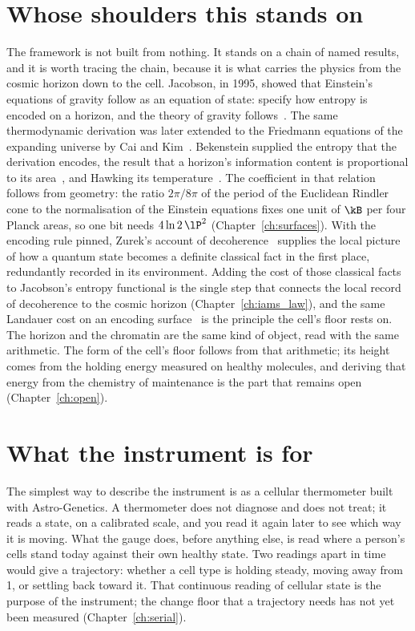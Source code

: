 \section{Whose shoulders this stands on}\label{sec:ag_lineage}

The framework is not built from nothing. It stands on a chain of named results, and it is worth tracing the chain, because it is what
carries the physics from the cosmic horizon down to the cell. Jacobson, in 1995, showed that Einstein's equations of gravity follow as an
equation of state: specify how entropy is encoded on a horizon, and the theory of gravity follows~\cite{Jacobson1995}. The same
thermodynamic derivation was later extended to the Friedmann equations of the expanding universe by Cai and Kim~\cite{CaiKim2005}.
Bekenstein supplied the entropy that the derivation encodes, the result that a horizon's information content is proportional to its
area~\cite{Bekenstein1973}, and Hawking its temperature~\cite{Hawking1975}. The coefficient in that relation follows from geometry: the
ratio $2\pi/8\pi$ of the period of the Euclidean Rindler cone to the normalisation of the Einstein equations fixes one unit of $\kB$ per
four Planck areas, so one bit needs $4\ln2\,\lP^2$ (Chapter~\ref{ch:surfaces}). \derived{} With the encoding rule pinned, Zurek's account
of decoherence~\cite{Zurek2003} supplies the local picture of how a quantum state becomes a definite classical fact in the first place,
redundantly recorded in its environment. Adding the cost of those classical facts to Jacobson's entropy functional is the single step
that connects the local record of decoherence to the cosmic horizon (Chapter~\ref{ch:iams_law}), and the same Landauer cost on an encoding
surface~\cite{Landauer1961} is the principle the cell's floor rests on. The horizon and the chromatin are the same kind of object, read
with the same arithmetic. \conjecture{} The form of the cell's floor follows from that arithmetic; its height comes from the holding energy
measured on healthy molecules, and deriving that energy from the chemistry of maintenance is the part that remains open
(Chapter~\ref{ch:open}). \openprob

\section{What the instrument is for}\label{sec:ag_for}

The simplest way to describe the instrument is as a cellular thermometer built with Astro-Genetics. A thermometer does not diagnose and
does not treat; it reads a state, on a calibrated scale, and you read it again later to see which way it is moving. What the gauge does,
before anything else, is read where a person's cells stand today against their own healthy state. Two readings apart in time would give a
trajectory: whether a cell type is holding steady, moving away from 1, or settling back toward it. That continuous reading of cellular
state is the purpose of the instrument; the change floor that a trajectory needs has not yet been measured (Chapter~\ref{ch:serial}).
\openprob

